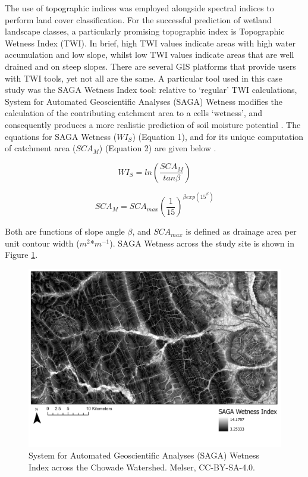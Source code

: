 \documentclass[
]{book}
\begin{document}
The use of topographic indices was employed alongside spectral indices to perform land cover classification. For the successful prediction of wetland landscape classes, a particularly promising topographic index is Topographic Wetness Index (TWI). In brief, high TWI values indicate areas with high water accumulation and low slope, whilst low TWI values indicate areas that are well drained and on steep slopes. There are several GIS platforms that provide users with TWI tools, yet not all are the same. A particular tool used in this case study was the SAGA Wetness Index tool: relative to `regular' TWI calculations, System for Automated Geoscientific Analyses (SAGA) Wetness modifies the calculation of the contributing catchment area to a cells `wetness', and consequently produces a more realistic prediction of soil moisture potential \citep{mattivi_twi_2019}. The equations for SAGA Wetness (\(WI_S\)) (Equation 1), and for its unique computation of catchment area (\(SCA_M\)) (Equation 2) are given below \citep{bohner_spatial_2006}.

\[
\tag{Equation 1} 
WI_S = ln (\frac{SCA_M}{tan\beta})
\]

\[
\tag{Equation 2}
SCA_M = SCA_{max} (\frac{1}{15})^{\beta exp(15^{\beta})}
\]

Both are functions of slope angle \(\beta\), and \(SCA_{max}\) is defined as drainage area per unit contour width (\(m^2\)*\(m^{-1}\)). SAGA Wetness across the study site is shown in Figure \ref{fig:9-SAGA-Wetness}.

\begin{figure}
\includegraphics[width=0.75\linewidth]{images/09-SAGA-Wetness} \caption{System for Automated Geoscientific Analyses (SAGA) Wetness Index across the Chowade Watershed. Melser, CC-BY-SA-4.0.}\label{fig:9-SAGA-Wetness}
\end{figure}
\end{document}
